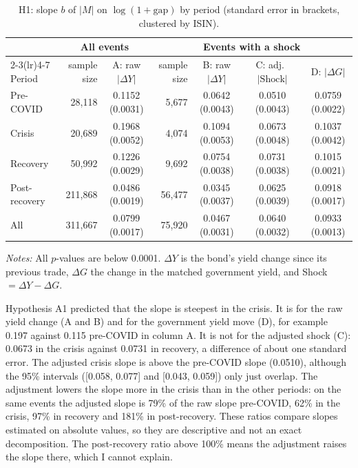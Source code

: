 \documentclass[a4paper,11pt]{article}
\begin{document}
\begin{table}[htbp]
\centering
\caption{H1: slope $b$ of $|M|$ on $\log(1+\text{gap})$ by period (standard error in brackets, clustered by ISIN).}
\label{tab:h1}
\footnotesize
\setlength{\tabcolsep}{4pt}
\begin{tabular}{lrcrccc}
\toprule
 & \multicolumn{2}{c}{All events} & \multicolumn{4}{c}{Events with a shock} \\
\cmidrule(lr){2-3}\cmidrule(lr){4-7}
Period & sample size & A: raw $|\Delta Y|$ & sample size & B: raw $|\Delta Y|$ & C: adj.\ $|\text{Shock}|$ & D: $|\Delta G|$ \\
\midrule
Pre-COVID      & 28,118  & 0.1152 (0.0031) & 5,677  & 0.0642 (0.0043) & 0.0510 (0.0043) & 0.0759 (0.0022) \\
Crisis         & 20,689  & 0.1968 (0.0052) & 4,074  & 0.1094 (0.0053) & 0.0673 (0.0048) & 0.1037 (0.0042) \\
Recovery       & 50,992  & 0.1226 (0.0029) & 9,692  & 0.0754 (0.0038) & 0.0731 (0.0038) & 0.1015 (0.0021) \\
Post-recovery  & 211,868 & 0.0486 (0.0019) & 56,477 & 0.0345 (0.0037) & 0.0625 (0.0039) & 0.0918 (0.0017) \\
\midrule
All            & 311,667 & 0.0799 (0.0017) & 75,920 & 0.0467 (0.0031) & 0.0640 (0.0032) & 0.0933 (0.0013) \\
\bottomrule
\end{tabular}

\vspace{4pt}
\begin{minipage}{0.97\textwidth}\footnotesize\raggedright
\textit{Notes:} All $p$-values are below 0.0001. $\Delta Y$ is the bond's yield change since its previous trade, $\Delta G$ the change in the matched government yield, and Shock $= \Delta Y - \Delta G$.
\end{minipage}
\end{table}

Hypothesis A1 predicted that the slope is steepest in the crisis. It is for the raw yield change (A and B) and for the government yield move (D), for example 0.197 against 0.115 pre-COVID in column A. It is not for the adjusted shock (C): 0.0673 in the crisis against 0.0731 in recovery, a difference of about one standard error. The adjusted crisis slope is above the pre-COVID slope (0.0510), although the 95\% intervals ([0.058, 0.077] and [0.043, 0.059]) only just overlap. The adjustment lowers the slope more in the crisis than in the other periods: on the same events the adjusted slope is 79\% of the raw slope pre-COVID, 62\% in the crisis, 97\% in recovery and 181\% in post-recovery. These ratios compare slopes estimated on absolute values, so they are descriptive and not an exact decomposition. The post-recovery ratio above 100\% means the adjustment raises the slope there, which I cannot explain.
\end{document}
